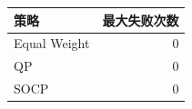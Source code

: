 \begin{center}
\small
\begin{tabular}{lr}
\toprule
策略 & 最大失败次数 \\
\midrule
Equal Weight & 0 \\
QP & 0 \\
SOCP & 0 \\
\bottomrule
\end{tabular}
\end{center}
